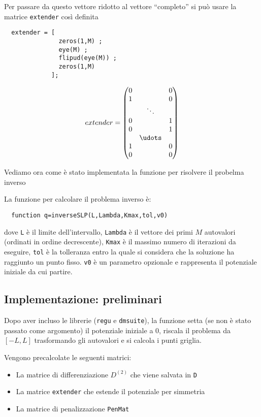 \documentclass[a4paper,10pt]{article}
\theoremstyle{plain}
\theoremstyle{definition}
\theoremstyle{remark}
\begin{document}
Per passare da questo vettore ridotto al vettore ``completo'' si può
usare la matrice \lstinline{extender} così definita
\begin{lstlisting}
  extender = [ 
               zeros(1,M) ; 
               eye(M) ;
               flipud(eye(M)) ;
               zeros(1,M)
             ];
\end{lstlisting}
\begin{equation*}
  extender =
  \begin{pmatrix}
    0 & & 0 \\
    1 & & 0 \\
    & \ddots & \\
    0 & & 1 \\
    0 & & 1 \\
    & \udots & \\
    1 & &0 \\
    0 & & 0\\
  \end{pmatrix}
\end{equation*}

Vediamo ora come è stato implementata la funzione per risolvere il
probelma inverso

La funzione per calcolare il problema inverso è:
\begin{lstlisting}
  function q=inverseSLP(L,Lambda,Kmax,tol,v0)
\end{lstlisting}
dove \lstinline{L} è il limite dell'intervallo, \lstinline{Lambda} è
il vettore dei primi $M$ autovalori (ordinati in ordine decrescente),
\lstinline{Kmax} è il massimo numero di iterazioni da eseguire,
\lstinline{tol} è la tolleranza entro la quale si considera che la
soluzione ha raggiunto un punto fisso. \lstinline{v0} è un parametro
opzionale e rappresenta il potenziale iniziale da cui partire.

\subsection{Implementazione: preliminari}

Dopo aver incluso le librerie (\lstinline{regu} e
\lstinline{dmsuite}), la funzione setta (se non è stato passato come
argomento) il potenziale iniziale a $0$, riscala il problema da
$[-L,L]$ trasformando gli autovalori e si calcola i punti griglia.

Vengono precalcolate le seguenti matrici:
\begin{itemize}
\item La matrice di differenziazione $D^{(2)}$ che viene salvata in
  \lstinline{D}
\item La matrice \lstinline{extender} che estende il potenziale per
  simmetria
\item La matrice di penalizzazione \lstinline{PenMat}
\end{itemize}
\end{document}
